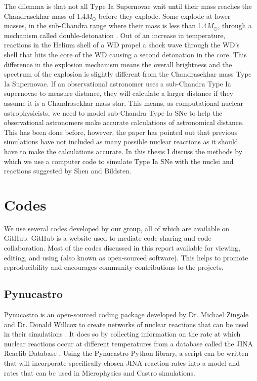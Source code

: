 \documentclass[preprint]{aastex62}
\begin{document}
  The dilemma is that not all Type Ia Supernovae wait until their mass reaches  the Chandrasekhar mass of 1.4$M_{\odot}$ before they explode. Some explode at lower masses, in the sub-Chandra range where their mass is less than 1.4$M_{\odot}$, through a mechanism called double-detonation \citep{doubledet1, doubledet2}. Out of an increase in temperature, reactions in the Helium shell of a WD propel a shock wave through the WD's shell that hits the core of the WD causing a second detonation in the core. This difference in the explosion mechanism means the overall brightness and the spectrum of the explosion is slightly different from the Chandrasekhar mass Type Ia Supernovae. If an observational astronomer uses a sub-Chandra Type Ia supernovae to measure distance, they will calculate a larger distance if they assume it is a Chandrasekhar mass star. This means, as computational nuclear astrophysicists, we need to model sub-Chandra Type Ia SNe to help the observational astronomers make accurate calculations of astronomical distance. This has been done before, however, the paper \citet{shenNbildsten} has pointed out that previous simulations have not included as many possible nuclear reactions as it should have to make the calculations accurate. In this thesis I discuss the methods by which we use a computer code to simulate Type Ia SNe with the nuclei and reactions suggested by Shen and Bildsten. 

\section{Codes}
  	
    We use several codes developed by our group, all of which are available on GitHub. GitHub is a website used to mediate code sharing and code collaboration. Most of the codes discussed in this report available for viewing, editing, and using (also known as open-sourced software). This helps to promote reproducibility and encourages community contributions to the projects. 

  \subsection{Pynucastro}
    
    Pynucastro is an open-sourced coding package developed by Dr. Michael Zingale and Dr. Donald Willcox to create networks of nuclear reactions that can be used in their simulations \citep{pynucastro}. It does so by collecting information on the rate at which nuclear reactions occur at different temperatures from a database called the JINA Reaclib Database \citep{JINA}. Using the Pynucastro Python library, a script can be written that will incorporate specifically chosen JINA reaction rates into a model and rates that can be used in Microphysics and Castro simulations.
  
\end{document}
